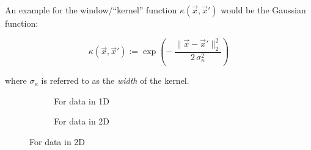 \begin{frame}

An example for the window/``kernel'' function $\kappa(\vec x, \vec x')$ would be the Gaussian function:

\begin{equation}
\kappa(\vec x, \vec x') := \exp\left( -\,\frac{\lVert \vec x - \vec x'\rVert^2_2}{2\,\sigma_{\kappa}^2} \right)
\label{eq:gauss_kernel}
\end{equation}

where $\sigma_{\kappa}$ is referred to as the \emph{width} of the kernel.

\begin{figure}[ht]
     \centering
     \begin{subfigure}[t]{0.45\textwidth}
         \centering
         \usebox{\imagebox}%
         \caption{For data in 1D}
         \label{fig:quadratic}
     \end{subfigure}
     \hspace{2mm}
     \begin{subfigure}[t]{0.45\textwidth}
         \centering
         \caption{For data in 2D}
         \label{fig:linear}
     \end{subfigure}
	 \label{fig:quadratic_density_gaussian}
\end{figure}

\end{frame}

